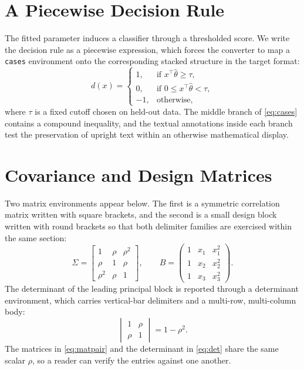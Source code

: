 \documentclass[11pt]{article}
\begin{document}
\section{A Piecewise Decision Rule}
\label{sec:cases}

The fitted parameter induces a classifier through a thresholded score. We write
the decision rule as a piecewise expression, which forces the converter to map
a \texttt{cases} environment onto the corresponding stacked structure in the
target format:
\begin{equation}
d(x) =
\begin{cases}
1, & \text{if } x^{\top}\hat{\theta} \geq \tau,\\[2pt]
0, & \text{if } 0 \leq x^{\top}\hat{\theta} < \tau,\\[2pt]
-1, & \text{otherwise},
\end{cases}
\label{eq:cases}
\end{equation}
where $\tau$ is a fixed cutoff chosen on held-out data. The middle branch of
\cref{eq:cases} contains a compound inequality, and the textual annotations
inside each branch test the preservation of upright text within an otherwise
mathematical display.

\section{Covariance and Design Matrices}
\label{sec:matrices}

Two matrix environments appear below. The first is a symmetric correlation
matrix written with square brackets, and the second is a small design block
written with round brackets so that both delimiter families are exercised
within the same section:
\begin{equation}
\Sigma =
\begin{bmatrix}
1 & \rho & \rho^2\\
\rho & 1 & \rho\\
\rho^2 & \rho & 1
\end{bmatrix},
\qquad
B =
\begin{pmatrix}
1 & x_{1} & x_{1}^2\\
1 & x_{2} & x_{2}^2\\
1 & x_{3} & x_{3}^2
\end{pmatrix}.
\label{eq:matpair}
\end{equation}
The determinant of the leading principal block is reported through a
determinant environment, which carries vertical-bar delimiters and a multi-row,
multi-column body:
\begin{equation}
\begin{vmatrix}
1 & \rho\\
\rho & 1
\end{vmatrix}
= 1 - \rho^2 .
\label{eq:det}
\end{equation}
The matrices in \cref{eq:matpair} and the determinant in \cref{eq:det} share the
same scalar $\rho$, so a reader can verify the entries against one another.
\end{document}

